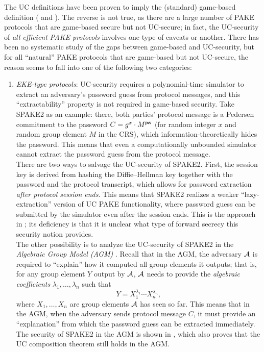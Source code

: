 The UC definitions have been proven to imply the (standard) game-based definition (\cite[Appendix~A]{EC:CHKLM05} and \cite[Section~5]{C:ABBJKX20}). The reverse is not true, as there are a large number of PAKE protocols that are game-based secure but not UC-secure; in fact, the UC-security of \emph{all efficient PAKE protocols} involves one type of caveats or another. There has been no systematic study of the gaps between game-based and UC-security, but for all ``natural'' PAKE protocols that are game-based but not UC-secure, the reason seems to fall into one of the following two categories:
\begin{enumerate}
  \item \emph{EKE-type protocols}: UC-security requires a polynomial-time simulator to extract an adversary's password guess from protocol messages, and this ``extractability'' property is not required in game-based security. Take SPAKE2 as an example: there, both parties' protocol message is a Pedersen commitment to the password $C = g^x \cdot M^{\mathsf{pw}}$ (for random integer $x$ and random group element $M$ in the CRS), which information-theoretically hides the password. This means that even a computationally unbounded simulator cannot extract the password guess from the protocol message.\\
      There are two ways to salvage the UC-security of SPAKE2. First, the session key is derived from hashing the Diffie--Hellman key together with the password and the protocol transcript, which allows for password extraction \emph{after protocol session ends}. This means that SPAKE2 realizes a weaker ``lazy-extraction'' version of UC PAKE functionality, where password guess can be submitted by the simulator even after the session ends. This is the approach in \cite{C:ABBJKX20}; its deficiency is that it is unclear what type of forward secrecy this security notion provides. \\
      The other possibility is to analyze the UC-security of SPAKE2 in the \emph{Algebraic Group Model (AGM)} \cite{C:FucKilLos18}. Recall that in the AGM, the adversary $\mathcal{A}$ is required to ``explain'' how it computed all group elements it outputs; that is, for any group element $Y$ output by $\mathcal{A}$, $\mathcal{A}$ needs to provide the \emph{algebraic coefficients} $\lambda_1,\dots,\lambda_n$ such that
      \[
      Y = X_1^{\lambda_1}\cdots X_n^{\lambda_n},
      \]
      where $X_1,\dots,X_n$ are group elements $\mathcal{A}$ has seen so far. This means that in the AGM, when the adversary sends protocol message $C$, it must provide an ``explanation'' from which the password guess can be extracted immediately. The security of SPAKE2 in the AGM is shown in \cite{AC:ABKLX21}, which also proves that the UC composition theorem still holds in the AGM.

\end{enumerate}
